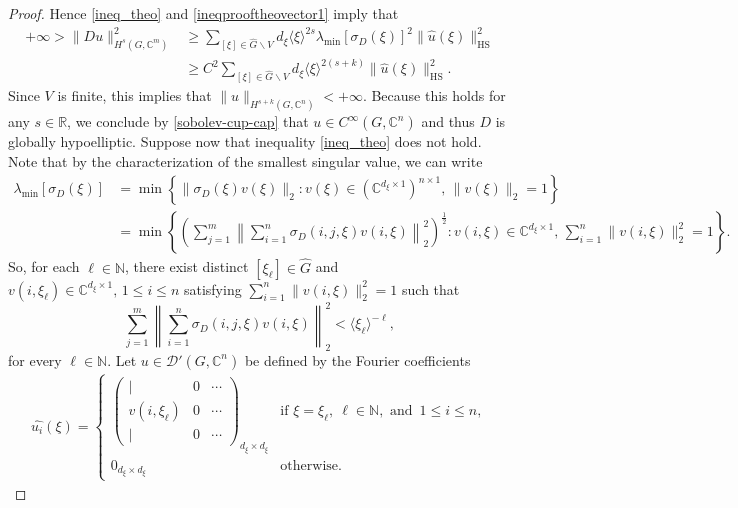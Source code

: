 \documentclass[11pt]{amsart}
\numberwithin{theorem}{section}
\numberwithin{equation}{section}
\theoremstyle{definition}
\numberwithin{example}{section}
\theoremstyle{definition}
\theoremstyle{definition}
\newcommand{\N}{\mathbb{N}}
\newcommand{\C}{\mathbb{C}}
\newcommand{\HS}{\operatorname{HS}}
\begin{document}
\begin{proof}
        Hence \eqref{ineq_theo} and \eqref{ineqprooftheovector1} imply that
    \begin{align*}    
         +\infty>\|Du\|^2_{H^s(G,\C^m)}&\geq\sum_{[\xi]\in \widehat{G}\backslash V} d_\xi\langle\xi\rangle^{2s} \lambda_{\min}[\sigma_D(\xi)]^2\|\widehat{u}(\xi)\|_{\HS}^2\\
        & \geq C^2\sum_{[\xi]\in \widehat{G}\backslash V}d_\xi\langle\xi\rangle^{2(s+k)}\|\widehat{u}(\xi)\|_{\HS}^2.
    \end{align*}
    Since $V$ is finite, this implies that $\|u\|_{H^{s+k}(G,\C^n)}<+\infty$. Because this holds for any $s\in\mathbb{R}$, we conclude by \eqref{sobolev-cup-cap} that $u\in C^\infty(G,\C^n)$ and thus $D$ is globally hypoelliptic. 
     Suppose now that inequality \eqref{ineq_theo} does not hold. Note that by the characterization of the smallest singular value, we can write 
     \begin{align*}
         \lambda_{\min}[\sigma_D(\xi)]&=\min\left\{ \|\sigma_D(\xi)v(\xi)\|_2:v(\xi)\in (\C^{d_\xi\times 1})^{n\times 1},\,\|v(\xi)\|_2=1 \right\}\\
         &=\min\left\{\left(\sum_{j=1}^m\left\|\sum_{i=1}^n\sigma_D(i,j,\xi)v(i,\xi)\right\|_2^2\right)^{\frac{1}{2}}:v(i,\xi)\in \C^{d_\xi\times 1},\,\sum_{i=1}^n\|v(i,\xi)\|_2^2=1 \right\}.
     \end{align*}
     So, for each $\ell\in\mathbb{N}$, there exist distinct $[\xi_\ell]\in\widehat{G}$ and $v(i,\xi_\ell) \in \C^{d_\xi\times 1},\,1\leq i\leq n$ satisfying $\sum_{i=1}^n\|v(i,\xi)\|_2^2=1$  such that
    \begin{equation*}
\sum_{j=1}^m\left\|\sum_{i=1}^n\sigma_D(i,j,\xi)v(i,\xi)\right\|_2^2< \langle \xi_\ell\rangle^{-\ell},
    \end{equation*}
    for every $\ell\in \N$. Let $u\in \mathcal{D}'(G,\C^n)$ be defined by the Fourier coefficients
    \begin{align*}
        \widehat{u_i}(\xi) =\begin{cases}
            \begin{pmatrix}
                \lvert&0&\cdots\\
                v(i,\xi_\ell)&0&\cdots\\
                \lvert&0&\cdots
            \end{pmatrix}_{d_\xi\times d_\xi}&\text{if } \xi=\xi_\ell,\ \ell\in\N, \text{ and }\,1\leq i\leq n,\\
            0_{d_\xi\times d_\xi}&\text{otherwise.}

\end{cases}
\end{align*}
\end{proof}
\end{document}
